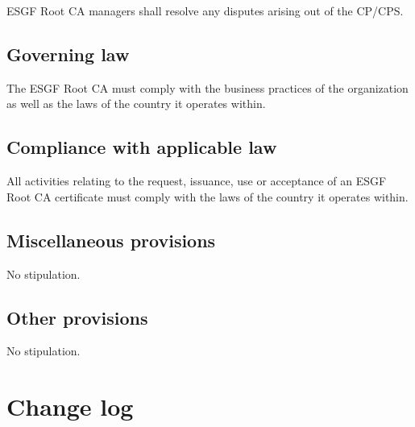 ESGF Root CA managers shall resolve any disputes arising out of the
CP/CPS.

\subsection{Governing law}\label{governing-law}
The ESGF Root CA must comply with the business practices of the organization as well as the laws of the country it operates within.

\subsection{Compliance with applicable law}\label{compliance-with-applicable-law}

All activities relating to the request, issuance, use or acceptance of an ESGF Root CA certificate must comply with the laws of the country it operates within.

\subsection{Miscellaneous provisions}\label{miscellaneous-provisions}

No stipulation.

\subsection{Other provisions}\label{other-provisions}

No stipulation.

\section{Change log}\label{change-log}

\newpage
